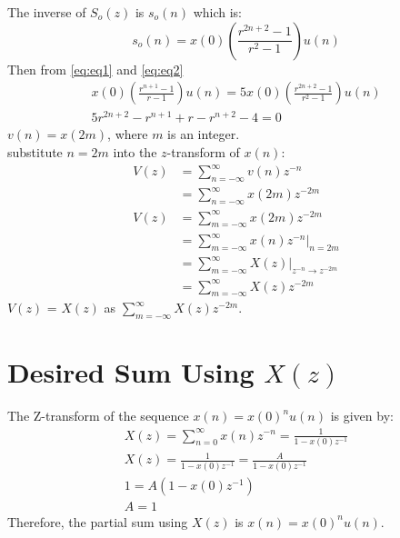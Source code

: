 \documentclass{article}
\begin{document}
The inverse of $S_o(z)$ is $s_o(n)$ which is:
\begin{equation}
s_o(n) = x(0)\left(\frac{r^{2n+2}-1}{r^2-1}\right)u(n)
\label{eq:eq2}
\end{equation}
Then from \eqref{eq:eq1} and \eqref{eq:eq2}
\begin{align}
x(0)(\frac{r^{n+1}-1}{r-1})u(n)=5x(0)(\frac{r^{2n+2}-1}{r^2-1})u(n)\\
5r^{2n+2} - r^{n+1} + r - r^{n+2} - 4 = 0
\end{align}
\(v(n)=x(2m)\), where \(m\) is an integer.\\
substitute \(n=2m\) into the \(z\)-transform of \(x(n)\):
\begin{align}
V(z) & = \sum_{n=-\infty}^{\infty} v(n)z^{-n} \\
     & = \sum_{n=-\infty}^{\infty} x(2m)z^{-2m}\\
V(z) & = \sum_{m=-\infty}^{\infty} x(2m)z^{-2m} \\
     & = \sum_{m=-\infty}^{\infty} x(n)z^{-n} \Bigg|_{n=2m} \\
     & = \sum_{m=-\infty}^{\infty} X(z) \Bigg|_{z^{-n} \rightarrow z^{-2m}} \\
     & = \sum_{m=-\infty}^{\infty} X(z)z^{-2m}
\end{align}
\(V(z)\) = \(X(z)\) as \(\sum_{m=-\infty}^{\infty} X(z)z^{-2m}\).
\section*{Desired Sum Using $X(z)$}
The Z-transform of the sequence \( x(n) = x(0)^n u(n) \) is given by:
\begin{align}
X(z) = \sum_{n=0}^{\infty} x(n)z^{-n} = \frac{1}{1 - x(0)z^{-1}}\\
X(z) = \frac{1}{1 - x(0)z^{-1}} = \frac{A}{1 - x(0)z^{-1}}\\
1 = A(1 - x(0)z^{-1}) \\
A=1
\end{align}
Therefore, the partial sum using \(X(z)\) is \(x(n) = x(0)^n u(n)\).
\end{document}
